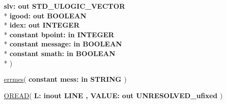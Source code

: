 \begin{DoxyCompactItemize}
  {\bfseries \textcolor{vhdlchar}{ }\textcolor{vhdlchar}{slv\+: }\textcolor{stringliteral}{} {\bfseries \textcolor{keywordflow}{out}\textcolor{vhdlchar}{ }\textcolor{comment}{S\+T\+D\+\_\+\+U\+L\+O\+G\+I\+C\+\_\+\+V\+E\+C\+T\+O\+R}\textcolor{vhdlchar}{ }}}\\*
  {\bfseries \textcolor{vhdlchar}{ }\textcolor{vhdlchar}{igood\+: }\textcolor{stringliteral}{} {\bfseries \textcolor{keywordflow}{out}\textcolor{vhdlchar}{ }\textcolor{comment}{B\+O\+O\+L\+E\+A\+N}\textcolor{vhdlchar}{ }}}\\*
  {\bfseries \textcolor{vhdlchar}{ }\textcolor{vhdlchar}{idex\+: }\textcolor{stringliteral}{} {\bfseries \textcolor{keywordflow}{out}\textcolor{vhdlchar}{ }\textcolor{comment}{I\+N\+T\+E\+G\+E\+R}\textcolor{vhdlchar}{ }}}\\*
  {\bfseries \textcolor{keywordflow}{constant }\textcolor{vhdlchar}{bpoint\+: }\textcolor{stringliteral}{} {\bfseries \textcolor{keywordflow}{in}\textcolor{vhdlchar}{ }\textcolor{comment}{I\+N\+T\+E\+G\+E\+R}\textcolor{vhdlchar}{ }}}\\*
  {\bfseries \textcolor{keywordflow}{constant }\textcolor{vhdlchar}{message\+: }\textcolor{stringliteral}{} {\bfseries \textcolor{keywordflow}{in}\textcolor{vhdlchar}{ }\textcolor{comment}{B\+O\+O\+L\+E\+A\+N}\textcolor{vhdlchar}{ }}}\\*
  {\bfseries \textcolor{keywordflow}{constant }\textcolor{vhdlchar}{smath\+: }\textcolor{stringliteral}{} {\bfseries \textcolor{keywordflow}{in}\textcolor{vhdlchar}{ }\textcolor{comment}{B\+O\+O\+L\+E\+A\+N}\textcolor{vhdlchar}{ }}}\\*
   )
\item 
{\bfseries {\bfseries \textcolor{vhdlchar}{ }}} \hyperlink{class__fixed__pkg_a01ae8a1428d06176f59f7fe4220a4163}{errmes}( {\bfseries \textcolor{keywordflow}{constant }\textcolor{vhdlchar}{mess\+: }\textcolor{stringliteral}{} {\bfseries \textcolor{keywordflow}{in}\textcolor{vhdlchar}{ }\textcolor{comment}{S\+T\+R\+I\+N\+G}\textcolor{vhdlchar}{ }}} )
\item 
{\bfseries {\bfseries \textcolor{vhdlchar}{ }}} \hyperlink{class__fixed__pkg_aee7eef038bb2e610868a9cb8c0c14497}{O\+R\+E\+A\+D}( {\bfseries \textcolor{vhdlchar}{ }\textcolor{vhdlchar}{L\+: }\textcolor{stringliteral}{} {\bfseries \textcolor{keywordflow}{inout}\textcolor{vhdlchar}{ }\textcolor{vhdlchar}{L\+I\+N\+E}\textcolor{vhdlchar}{ }}}{\bfseries ,\textcolor{vhdlchar}{ }\textcolor{vhdlchar}{V\+A\+L\+U\+E\+: }\textcolor{stringliteral}{} {\bfseries \textcolor{keywordflow}{out}\textcolor{vhdlchar}{ }\textcolor{vhdlchar}{U\+N\+R\+E\+S\+O\+L\+V\+E\+D\+\_\+ufixed}\textcolor{vhdlchar}{ }}} )

\end{DoxyCompactItemize}
